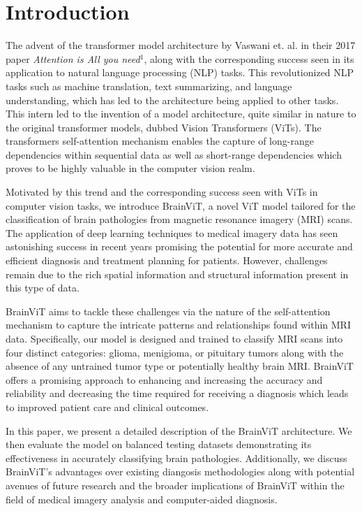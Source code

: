 \documentclass[conference]{IEEEtran}
\begin{document}
\section{Introduction}
The advent of the transformer model architecture by Vaswani et. al. in their 2017 paper \textit{Attention is All you need}$^1$, along with the corresponding success seen in its application to natural language processing (NLP) tasks.  This revolutionized NLP tasks such as machine translation, text summarizing, and language understanding, which has led to the architecture being applied to other tasks. This intern led to the invention of a model architecture, quite similar in nature to the original transformer models, dubbed Vision Transformers (ViTs). The transformers self-attention mechanism enables the capture of long-range dependencies within sequential data as well as short-range dependencies which proves to be highly valuable in the computer vision realm.

Motivated by this trend and the corresponding success seen with ViTs in computer vision tasks, we introduce BrainViT, a novel ViT model tailored for the classification of brain pathologies from magnetic resonance imagery (MRI) scans. The application of deep learning techniques to medical imagery data has seen astonishing success in recent years promising the potential for more accurate and efficient diagnosis and treatment planning for patients. However, challenges remain due to the rich spatial information and structural information present in this type of data.

BrainViT aims to tackle these challenges via the nature of the self-attention mechanism to capture the intricate patterns and relationships found within MRI data. Specifically, our model is designed and trained to classify MRI scans into four distinct categories: glioma, menigioma, or pituitary tumors along with the absence of any untrained tumor type or potentially healthy brain MRI. BrainViT offers a promising approach to enhancing and increasing the accuracy and reliability and decreasing the time required for receiving a diagnosis which leads to improved patient care and clinical outcomes. 

In this paper, we present a detailed description of the BrainViT architecture. We then evaluate the model on balanced testing datasets demonstrating its effectiveness in accurately classifying brain pathologies. Additionally, we discuss BrainViT's advantages over existing diangosis methodologies along with potential avenues of future research and the broader implications of BrainViT within the field of medical imagery analysis and computer-aided diagnosis.
\end{document}
